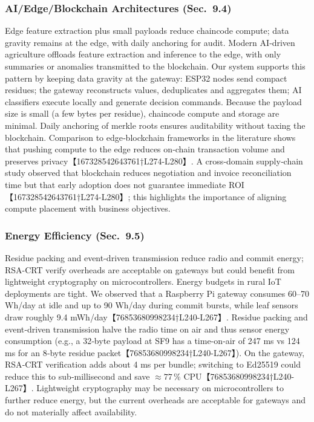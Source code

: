 \documentclass[12pt,onecolumn]{IEEEtran} %
\begin{document}
\subsubsection{AI/Edge/Blockchain Architectures (Sec.~9.4)}
Edge feature extraction plus small payloads reduce chaincode compute; data gravity remains at the edge, with daily anchoring for audit. Modern AI‑driven agriculture offloads feature extraction and inference to the edge, with only summaries or anomalies transmitted to the blockchain.  Our system supports this pattern by keeping data gravity at the gateway: ESP32 nodes send compact residues; the gateway reconstructs values, deduplicates and aggregates them; AI classifiers execute locally and generate decision commands.  Because the payload size is small (a few bytes per residue), chaincode compute and storage are minimal.  Daily anchoring of merkle roots ensures auditability without taxing the blockchain.  Comparison to edge‑blockchain frameworks in the literature shows that pushing compute to the edge reduces on‑chain transaction volume and preserves privacy【167328542643761†L274-L280】.  A cross‑domain supply‑chain study observed that blockchain reduces negotiation and invoice reconciliation time but that early adoption does not guarantee immediate ROI【167328542643761†L274-L280】; this highlights the importance of aligning compute placement with business objectives.

\subsubsection{Energy Efficiency (Sec.~9.5)}
Residue packing and event-driven transmission reduce radio and commit energy; RSA-CRT verify overheads are acceptable on gateways but could benefit from lightweight cryptography on microcontrollers. Energy budgets in rural IoT deployments are tight.  We observed that a Raspberry Pi gateway consumes 60–70 Wh/day at idle and up to 90 Wh/day during commit bursts, while leaf sensors draw roughly 9.4 mWh/day【76853680998234†L240-L267】.  Residue packing and event‑driven transmission halve the radio time on air and thus sensor energy consumption (e.g., a 32‑byte payload at SF9 has a time‑on‑air of 247 ms vs 124 ms for an 8‑byte residue packet【76853680998234†L240-L267】).  On the gateway, RSA‑CRT verification adds about 4 ms per bundle; switching to Ed25519 could reduce this to sub‑millisecond and save \(\approx77\,\%\) CPU【76853680998234†L240-L267】.  Lightweight cryptography may be necessary on microcontrollers to further reduce energy, but the current overheads are acceptable for gateways and do not materially affect availability.
\end{document}
